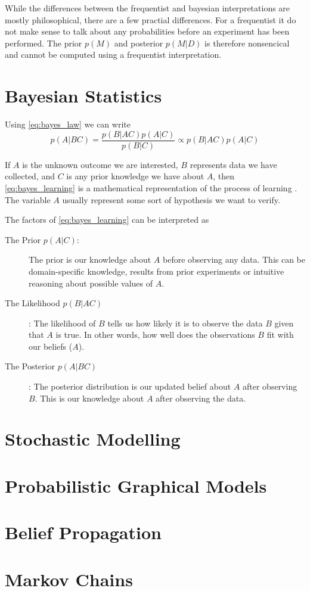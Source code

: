 While the differences between the frequentist and bayesian interpretations are mostly philosophical, there are a few practial differences. For a frequentist it do not make sense to talk about any probabilities before an experiment has been performed. The prior $p(M)$ and posterior $p(M | D)$ is therefore nonsencical and cannot be computed using a frequentist interpretation.     





\section{Bayesian Statistics}

Using \cref{eq:bayes_law} we can write 
\begin{equation}\label{eq:bayes_learning}
    p(A|BC) = \frac{p(B | AC) p(A | C)}{p(B | C)} \propto p(B | AC)p(A | C)
\end{equation}

If $A$ is the unknown outcome we are interested, $B$ represents data we have collected, and $C$ is any prior knowledge we have about $A$, then \cref{eq:bayes_learning} is a mathematical representation of the process of learning \cite{Jaynes86bayesianmethods:}. The variable $A$ usually represent some sort of hypothesis we want to verify. 

The factors of \cref{eq:bayes_learning} can be interpreted as
\begin{description}
    \item[The Prior $p(A | C)$:] The prior is our knowledge about $A$ before observing any data. This can be domain-specific knowledge, results from prior experiments or intuitive reasoning about possible values of $A$. 
    \item[The Likelihood $p(B | AC)$]: The likelihood of $B$ tells us how likely it is to observe the data $B$ given that $A$ is true. In other words, how well does the observations $B$ fit with our beliefs ($A$). 
    \item[The Posterior $p(A | BC)$]: The posterior distribution is our updated belief about $A$ after observing $B$. This is our knowledge about $A$ after observing the data. 
\end{description}

\section{Stochastic Modelling}

\section{Probabilistic Graphical Models}

\section{Belief Propagation}

\section{Markov Chains}

